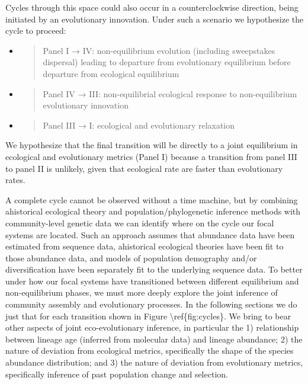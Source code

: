 \documentclass[]{article}
\begin{document}
Cycles through this space could also occur in a counterclockwise
direction, being initiated by an evolutionary innovation. Under such a
scenario we hypothesize the cycle to proceed:

\begin{itemize}
\item
  \begin{quote}
  Panel I → IV: non-equilibrium evolution (including sweepstakes
  dispersal) leading to departure from evolutionary equilibrium before
  departure from ecological equilibrium
  \end{quote}
\item
  \begin{quote}
  Panel IV → III: non-equilibrial ecological response to non-equilibrium
  evolutionary innovation
  \end{quote}
\item
  \begin{quote}
  Panel III → I: ecological and evolutionary relaxation
  \end{quote}
\end{itemize}

We hypothesize that the final transition will be directly to a joint
equilibrium in ecological and evolutionary metrics (Panel I) because a
transition from panel III to panel II is unlikely, given that ecological
rate are faster than evolutionary rates.

A complete cycle cannot be observed without a time machine, but by
combining ahistorical ecological theory and population/phylogenetic
inference methods with community-level genetic data we can identify
where on the cycle our focal systems are located. Such an approach
assumes that abundance data have been estimated from sequence data,
ahistorical ecological theories have been fit to those abundance data,
and models of population demography and/or diversification have been
separately fit to the underlying sequence data. To better under how our
focal systems have transitioned between different equilibrium and
non-equilibrium phases, we must more deeply explore the joint inference
of community assembly and evolutionary processes. In the following
sections we do just that for each transition shown in Figure
\textbackslash{}ref\{fig:cycles\}. We bring to bear other aspects of
joint eco-evolutionary inference, in particular the 1) relationship
between lineage age (inferred from molecular data) and lineage
abundance; 2) the nature of deviation from ecological metrics,
specifically the shape of the species abundance distribution; and 3) the
nature of deviation from evolutionary metrics, specifically inference of
past population change and selection.
\end{document}

